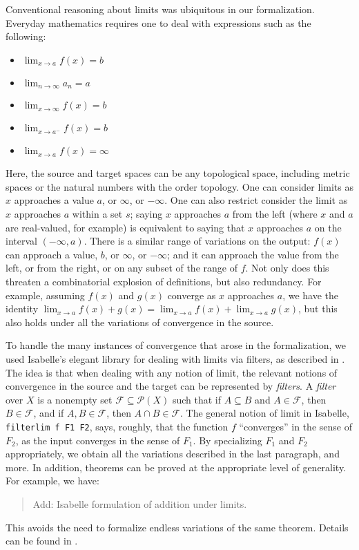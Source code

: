 \documentclass{svjour3}
\newcommand{\todo}[1]{{\color{red}#1}}
\begin{document}
Conventional reasoning about limits was ubiquitous in our formalization. Everyday mathematics requires one to deal with expressions such as the following:
\begin{itemize}
 \item $\lim_{x \to a} f(x) = b$
 \item $\lim_{n \to \infty} a_n = a$
 \item $\lim_{x \to \infty} f(x) = b$
 \item $\lim_{x \to a^-} f(x) = b$
 \item $\lim_{x \to a} f(x) = \infty$
\end{itemize}
Here, the source and target spaces can be any topological space, including metric spaces or the natural numbers with the order topology. One can consider limits as $x$ approaches a value $a$, or $\infty$, or $-\infty$. One can also restrict consider the limit as $x$ approaches $a$ within a set $s$; saying $x$ approaches $a$ from the left (where $x$ and $a$ are real-valued, for example) is equivalent to saying that $x$ approaches $a$ on the interval $(-\infty, a)$. There is a similar range of variations on the output: $f(x)$ can approach a value, $b$, or $\infty$, or $-\infty$; and it can approach the value from the left, or from the right, or on any subset of the range of $f$. Not only does this threaten a combinatorial explosion of definitions, but also redundancy. For example, assuming $f(x)$ and $g(x)$ converge as $x$ approaches $a$, we have the identity $\lim_{x \to a} f(x) + g(x) = \lim_{x \to a} f(x) + \lim_{x \to a} g(x)$, but this also holds under all the variations of convergence in the source.

To handle the many instances of convergence that arose in the formalization, we used Isabelle's elegant library for dealing with limits via filters, as described in \cite{hoelzl:et:al:13}. The idea is that when dealing with any notion of limit, the relevant notions of convergence in the source and the target can be represented by \emph{filters}. A {\em filter} over $X$ is a nonempty set $\mathcal F \subseteq \mathcal P(X)$ such that if $A \subseteq B$ and $A \in \mathcal F$, then $B \in \mathcal F$, and if $A, B \in \mathcal F$, then $A \cap B \in \mathcal F$. The general notion of limit in Isabelle, {\tt filterlim f F1 F2}, says, roughly, that the function $f$ ``converges'' in the sense of $F_2$, as the input converges in the sense of $F_1$. By specializing $F_1$ and $F_2$ appropriately, we obtain all the variations described in the last paragraph, and more. In addition, theorems can be proved at the appropriate level of generality. For example, we have:
\begin{quote}
 \todo{Add: Isabelle formulation of addition under limits.}
\end{quote}
This avoids the need to formalize endless variations of the same theorem. Details can be found in \cite{hoelzl:et:al:13}.
\end{document}
